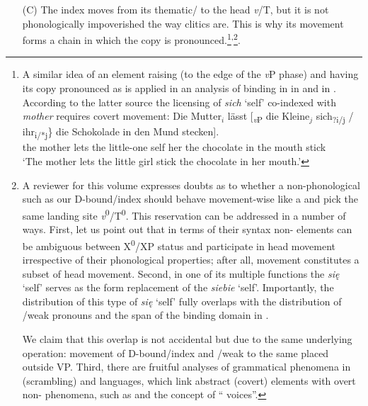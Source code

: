 \documentclass[output=paper,nonflat,colorlinks,citecolor=brown,newtxmath]{langsci/langscibook}
\begin{document}
\begin{itemize}
\newpage
    \item[(C)] The index moves from its thematic/ to the head \textit{v}/T, but it is not phonologically impoverished the way clitics are. This is why its movement forms a chain in which the copy is pronounced.\footnote{\label{fn7}A similar idea of an element raising (to the edge of the \textit{v}P phase) and having its copy pronounced as  is applied in an analysis of binding in  in \cite{safir2004} and in \cite[291]{leeschoenfeld2008}. According to the latter source the licensing of \textit{sich} ‘self’ co-indexed with \textit{mother} requires covert movement:
\ea
\gll Die Mutter$_i$ lässt [\textsubscript{\textit{v}P} die Kleine$_j$ \minsp{\{} sich\textsubscript{?i/j} / ihr\textsubscript{i/*j}\} die Schokolade in den Mund stecken].\\
the mother lets {} the little-one {} self {} her the chocolate in the mouth stick\\
\glt `The mother lets the little girl stick the chocolate in her mouth.’
\zlast}\textsuperscript{,}\footnote{\label{fn8}A reviewer for this volume expresses doubts as to whether a non-phonological  such as our D-bound/index should behave movement-wise like a  and pick the same landing site \textit{v}\textsuperscript{0}/T\textsuperscript{0}. This reservation can be addressed in a number of ways. First, let us point out that in terms of their syntax non- elements can be ambiguous between X\textsuperscript{0}/XP status and participate in head movement irrespective of their phonological properties; after all,  movement constitutes a subset of head movement. Second, in one of its multiple functions the   \textit{się} ‘self’ serves as the  form replacement of the   \textit{siebie} ‘self’. Importantly, the distribution of this type of \textit{się} ‘self’ fully overlaps with the distribution of /weak pronouns and the span of the binding domain in .

We claim that this overlap is not accidental but due to the same underlying operation: movement of D-bound/index and /weak  to the same  placed outside VP. Third, there are fruitful analyses of grammatical phenomena in  (scrambling) and  languages, which link abstract (covert)  elements with overt non- phenomena, such as \cite{sportiche1996} and the concept of `` voices''.}.
\end{itemize}
\end{document}
